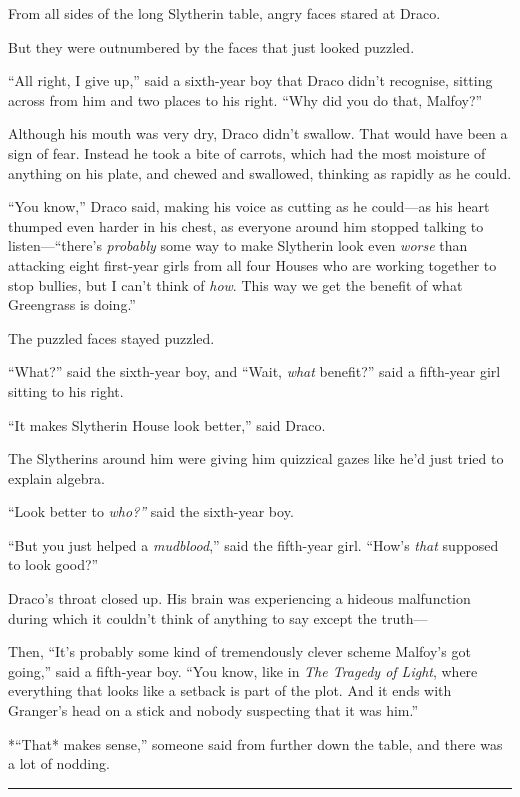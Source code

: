 From all sides of the long Slytherin table, angry faces stared at Draco.

But they were outnumbered by the faces that just looked puzzled.

``All right, I give up,'' said a sixth-year boy that Draco didn't
recognise, sitting across from him and two places to his right. ``Why
did you do that, Malfoy?''

Although his mouth was very dry, Draco didn't swallow. That would have
been a sign of fear. Instead he took a bite of carrots, which had the
most moisture of anything on his plate, and chewed and swallowed,
thinking as rapidly as he could.

``You know,'' Draco said, making his voice as cutting as he could---as
his heart thumped even harder in his chest, as everyone around him
stopped talking to listen---``there's \emph{probably} some way to make
Slytherin look even \emph{worse} than attacking eight first-year girls
from all four Houses who are working together to stop bullies, but I
can't think of \emph{how}. This way we get the benefit of what
Greengrass is doing.''

The puzzled faces stayed puzzled.

``What?'' said the sixth-year boy, and ``Wait, \emph{what} benefit?''
said a fifth-year girl sitting to his right.

``It makes Slytherin House look better,'' said Draco.

The Slytherins around him were giving him quizzical gazes like he'd just
tried to explain algebra.

``Look better to \emph{who?''} said the sixth-year boy.

``But you just helped a \emph{mudblood},'' said the fifth-year girl.
``How's \emph{that} supposed to look good?''

Draco's throat closed up. His brain was experiencing a hideous
malfunction during which it couldn't think of anything to say except the
truth---

Then, ``It's probably some kind of tremendously clever scheme Malfoy's
got going,'' said a fifth-year boy. ``You know, like in \emph{The
Tragedy of Light}, where everything that looks like a setback is part of
the plot. And it ends with Granger's head on a stick and nobody
suspecting that it was him.''

*``That* makes sense,'' someone said from further down the table, and
there was a lot of nodding.

\begin{center}\rule{3in}{0.4pt}\end{center}

